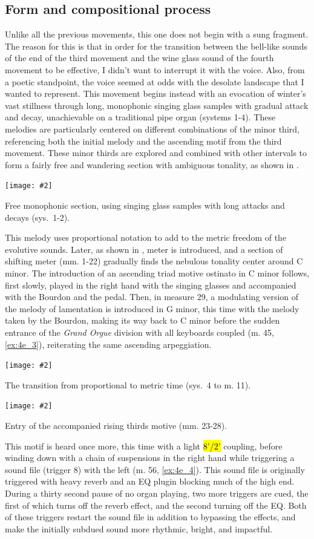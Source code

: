 \documentclass[12pt,twoside,maitrise]{dms_ks}
\newcommand{\customincludeexamples}[4][]{%
    \begin{example}[H]
        \centering
        \texttt{[image: \#2]}
        \caption{#4}
	\label{#3} 
    \end{example}
}
\theoremstyle{definition}
\begin{document}
{{\subsection{Form and compositional process}

Unlike all the previous movements, this one does not begin with a sung fragment. The reason for this is that in order for the transition between the bell-like sounds of the end of the third movement and the wine glass sound of the fourth movement to be effective, I didn't want to interrupt it with the voice. Also, from a poetic standpoint, the voice seemed at odds with the desolate landscape that I wanted to represent.
This movement begins instead with an evocation of winter's vast stillness through long, monophonic singing glass samples with gradual attack and decay, unachievable on a traditional pipe organ (systems 1-4).
These melodies are particularly centered on different combinations of the minor third, referencing both the initial melody and the ascending motif from the third movement.
These minor thirds are explored and combined with other intervals to form a fairly free and wandering section with ambiguous tonality, as shown in .

\customincludeexamples[width=\textwidth]{4e_1}{ex:4e_1}{Free monophonic section, using singing glass samples with long attacks and decays (sys.~1-2).}

This melody uses proportional notation to add to the metric freedom of the evolutive sounds. 
Later, as shown in , meter is introduced, and a section of shifting meter (mm. 1-22) gradually finds the nebulous tonality center around C minor.
The introduction of an ascending triad motive ostinato in C minor follows, first slowly, played in the right hand with the singing glasses and accompanied with the Bourdon and the pedal. 
Then, in measure 29, a modulating version of the melody of lamentation is introduced in G minor, this time with the melody taken by the Bourdon, making its way back to C minor before the sudden entrance of the \textit{Grand Orgue} division with all keyboards coupled (m. 45, \cref{ex:4e_3}), reiterating the same ascending arpeggiation. 

\customincludeexamples[width=\textwidth]{4e_2}{ex:4e_2}{The transition from proportional to metric time (sys.~4 to m. 11).}

\customincludeexamples[width=\textwidth]{4e_3}{ex:4e_3}{Entry of the accompanied rising thirds motive (mm. 23-28).}

This motif is heard once more, this time with a light \hl{8'/2'} coupling, before winding down with a chain of suspensions in the right hand while triggering a sound file (trigger 8) with the left (m. 56, \cref{ex:4e_4}). 
This sound file is originally triggered with heavy reverb and an EQ plugin blocking much of the high end. 
During a thirty second pause of no organ playing, two more triggers are cued, the first of which turns off the reverb effect, and the second turning off the EQ. 
Both of these triggers restart the sound file in addition to bypassing the effects, and make the initially subdued sound more rhythmic, bright, and impactful. 

}}
\end{document}
